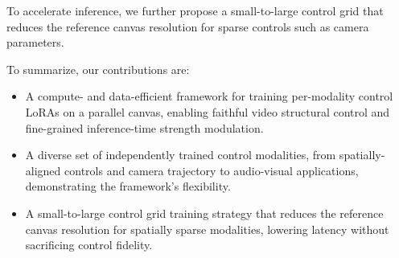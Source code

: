 To accelerate inference, we further propose a small-to-large control grid that reduces the reference canvas resolution for sparse controls such as camera parameters.

\vspace{0.5em}
\noindent To summarize, our contributions are:
\begin{itemize}
    \item A compute- and data-efficient framework for training per-modality control LoRAs on a parallel canvas, enabling faithful video structural control and fine-grained inference-time strength modulation.
    \item A diverse set of independently trained control modalities, from spatially-aligned controls and camera trajectory to audio-visual applications, demonstrating the framework's flexibility.
    \item A small-to-large control grid training strategy that reduces the reference canvas resolution for spatially sparse modalities, lowering latency without sacrificing control fidelity.
\end{itemize}